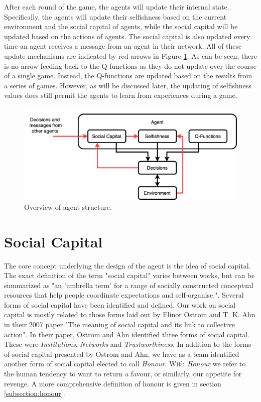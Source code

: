 After each round of the game, the agents will update their internal state. Specifically, the agents will update their selfishness based on the current environment and the social capital of agents, while the social capital will be updated based on the actions of agents. The social capital is also updated every time an agent receives a message from an agent in their network. All of these update mechanisms are indicated by red arrows in Figure \ref{fig:agent_structure}. As can be seen, there is no arrow feeding back to the Q-functions as they do not update over the course of a single game. Instead, the Q-functions are updated based on the results from a series of games. However, as will be discussed later, the updating of selfishness values does still permit the agents to learn from experiences during a game.

\begin{figure}[!h]
    \centering
    \includegraphics[width=0.75\linewidth]{004_team_1_agent_design/images/agent_structure.png}
    \caption{Overview of agent structure.}
    \label{fig:agent_structure}
\end{figure}

\section{Social Capital}

The core concept underlying the design of the agent is the idea of social capital. The exact definition of the term "social capital" varies between works, but can be summarized as "an 'umbrella term' for a range of socially constructed conceptual resources that help people coordinate expectations and self-organise."\cite{pitt}. Several forms of social capital have been identified and defined. Our work on social capital is mostly related to those forms laid out by Elinor Ostrom and T. K. Ahn in their 2007 paper "The meaning of social capital and its link to collective action". \cite{ostrom-ahn} In their paper, Ostrom and Ahn identified three forms of social capital. These were \emph{Institutions}, \emph{Networks} and \emph{Trustworthiness}. In addition to the forms of social capital presented by Ostrom and Ahn, we have as a team identified another form of social capital elected to call \emph{Honour}. With \emph{Honour} we refer to the human tendency to want to return a favour, or similarly, our appetite for revenge. A more comprehensive definition of honour is given in section \ref{subsection:honour}. 


